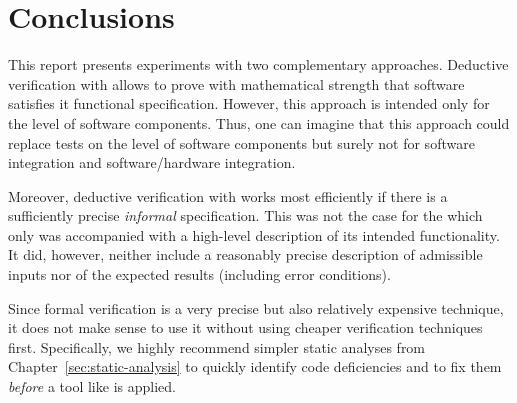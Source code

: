 
\chapter{Conclusions}
\label{sec:conclusions}

This report presents experiments with two complementary approaches.
Deductive verification with \framacwp allows to prove with mathematical strength
that software satisfies it functional specification.
However, this approach is intended only for the level of software components.
Thus, one can imagine that this approach could replace tests on the 
level of software components but surely not for software integration
and software\slash hardware integration.

Moreover, deductive verification with \framacwp works most efficiently
if there is a sufficiently precise \emph{informal} specification.
This was not the case for the \bitwalker which only was accompanied with
a high-level description of its intended functionality.
It did, however, neither include a reasonably precise description of admissible inputs
nor of the expected results (including error conditions).

Since formal verification is a very precise but also relatively expensive technique,
it does not make sense to use it without using cheaper verification techniques first.
Specifically, we highly recommend  simpler static analyses from 
Chapter~\ref{sec:static-analysis} to quickly identify code deficiencies
and to fix them \emph{before} a tool like \framacwp is applied.

